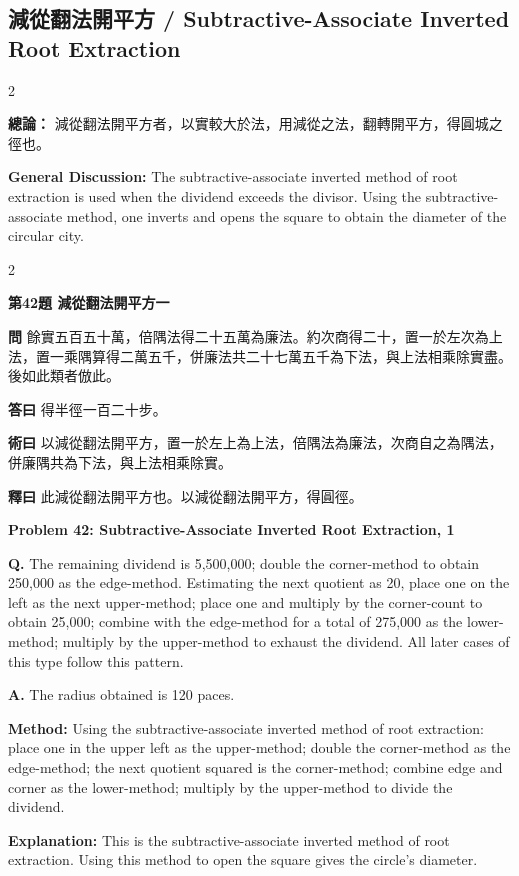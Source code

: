 \documentclass[11pt,a4paper]{article}
\newcommand{\wen}[1]{\noindent\textbf{問} #1\par\smallskip}
\newcommand{\da}[1]{\noindent\textbf{答曰} #1\par\smallskip}
\newcommand{\shu}[1]{\noindent\textbf{術曰} #1\par\smallskip}
\newcommand{\shi}[1]{\noindent\textbf{釋曰} #1\par\smallskip}
\newcommand{\wenE}[1]{\noindent\textbf{Q.} #1\par\smallskip}
\newcommand{\daE}[1]{\noindent\textbf{A.} #1\par\smallskip}
\newcommand{\shuE}[1]{\noindent\textbf{Method:} #1\par\smallskip}
\newcommand{\shiE}[1]{\noindent\textbf{Explanation:} #1\par\smallskip}
\begin{document}
\subsection*{減從翻法開平方 / Subtractive-Associate Inverted Root Extraction}

\begin{paracol}{2}

\noindent\textbf{總論：} 減從翻法開平方者，以實較大於法，用減從之法，翻轉開平方，得圓城之徑也。

\switchcolumn

\noindent\textbf{General Discussion:} The subtractive-associate inverted method of root extraction is used when the dividend exceeds the divisor. Using the subtractive-associate method, one inverts and opens the square to obtain the diameter of the circular city.

\end{paracol}

\bigskip

\begin{paracol}{2}

\noindent\textbf{第42題 減從翻法開平方一}

\wen{餘實五百五十萬，倍隅法得二十五萬為廉法。約次商得二十，置一於左次為上法，置一乘隅算得二萬五千，併廉法共二十七萬五千為下法，與上法相乘除實盡。後如此類者倣此。}
\da{得半徑一百二十步。}
\shu{以減從翻法開平方，置一於左上為上法，倍隅法為廉法，次商自之為隅法，併廉隅共為下法，與上法相乘除實。}
\shi{此減從翻法開平方也。以減從翻法開平方，得圓徑。}

\switchcolumn

\noindent\textbf{Problem 42: Subtractive-Associate Inverted Root Extraction, 1}

\wenE{The remaining dividend is 5,500,000; double the corner-method to obtain 250,000 as the edge-method. Estimating the next quotient as 20, place one on the left as the next upper-method; place one and multiply by the corner-count to obtain 25,000; combine with the edge-method for a total of 275,000 as the lower-method; multiply by the upper-method to exhaust the dividend. All later cases of this type follow this pattern.}
\daE{The radius obtained is 120 paces.}
\shuE{Using the subtractive-associate inverted method of root extraction: place one in the upper left as the upper-method; double the corner-method as the edge-method; the next quotient squared is the corner-method; combine edge and corner as the lower-method; multiply by the upper-method to divide the dividend.}
\shiE{This is the subtractive-associate inverted method of root extraction. Using this method to open the square gives the circle's diameter.}

\end{paracol}
\end{document}
